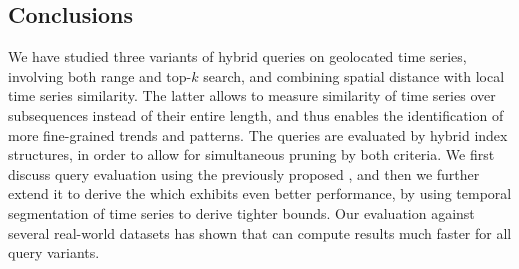 \subsection{Conclusions}
\label{sec:conclusions}

We have studied three variants of hybrid queries on geolocated time series, involving both range and top-$k$ search, and combining spatial distance with local time series similarity. The latter allows to measure similarity of time series over subsequences instead of their entire length, and thus enables the identification of more fine-grained trends and patterns. The queries are evaluated by hybrid index structures, in order to allow for simultaneous pruning by both criteria. We first discuss query evaluation using the previously proposed \btsr, and then we further extend it to derive the \sbtsr which exhibits even better performance, by using temporal segmentation of time series to derive tighter bounds. Our evaluation against several real-world datasets has shown that \sbtsr can compute results much faster for all query variants.